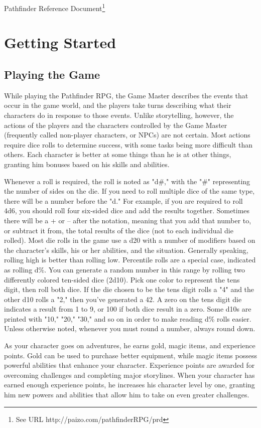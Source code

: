 Pathfinder Reference Document\footnote{See URL http://paizo.com/pathfinderRPG/prd}		

\chapter{Getting Started}
\section{Playing the Game}

\label{f0}
While playing the Pathfinder RPG, the Game Master describes the events that
occur in the game world, and the players take turns describing what their
characters do in response to those events. Unlike storytelling, however, the
actions of the players and the characters controlled by the Game Master
(frequently called non-player characters, or NPCs) are not certain. Most actions
require dice rolls to determine success, with some tasks being more difficult
than others. Each character is better at some things than he is at other things,
granting him bonuses based on his skills and abilities. 
				
Whenever a roll is required, the roll is noted as "d\#,"
with the "\#" representing the number of sides on the 
die. If you need to roll multiple dice of the same type, there will be a number 
before the "d." For example, if you are required to 
roll 4d6, you should roll four six-sided dice and add the results together. Sometimes there will be a + or -- after the notation, meaning that you add that number to, or subtract it from, the total results of the dice (not to each individual die rolled). Most die rolls in the game use a d20 with a number of modifiers based on the character's skills, his or her abilities, and the situation. Generally speaking, rolling high is better than rolling low. Percentile rolls are a special case, indicated as rolling d\%. You can generate a random number in this range by rolling two differently colored ten-sided dice (2d10). Pick one color to represent the tens digit, then roll both dice. If the die chosen to be the tens digit rolls a "4" and the other d10 rolls a "2," then you've generated a 42. A zero on the tens digit die indicates a result from 1 to 9, or 100 if both dice result in a zero. Some d10s are printed with "10," "20," "30," and so on in order to make reading d\% rolls easier. Unless otherwise noted, whenever you must round a number, always round down.
				
As your character goes on adventures, he earns gold, magic items, and experience points. Gold can be used to purchase better equipment, while magic items possess powerful abilities that enhance your character. Experience points are awarded for overcoming challenges and completing major storylines. When your character has earned enough experience points, he increases his character level by one, granting him new powers and abilities that allow him to take on even greater challenges.

